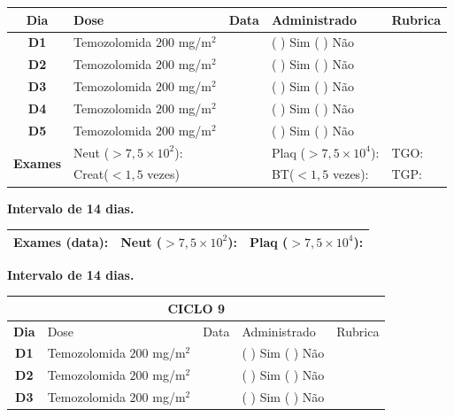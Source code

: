 \documentclass[11pt,a4paper,oldfontcommands]{memoir}
\begin{document}
\begin{center}
\begin{table}[H]
\begin{tabular}{p{1cm}p{5cm}|p{1cm}|p{4.5cm}|p{2cm}}
\hline
    \multicolumn{1}{c|}{\multirow{1}{*}{\textbf{Dia}}}&{Dose}&{Data}&{Administrado}&{Rubrica} \\
    \hline
    \multicolumn{1}{c|}{\multirow{1}{*}{\textbf{D1}}}&{Temozolomida \(200\) mg/m\(^2\)}&&{(  ) Sim (  ) Não}&\\
    \multicolumn{1}{c|}{\multirow{1}{*}{\textbf{D2}}}&{Temozolomida \(200\) mg/m\(^2\)}&&{(  ) Sim (  ) Não}&\\
    \multicolumn{1}{c|}{\multirow{1}{*}{\textbf{D3}}}&{Temozolomida \(200\) mg/m\(^2\)}&&{(  ) Sim (  ) Não}&\\
    \multicolumn{1}{c|}{\multirow{1}{*}{\textbf{D4}}}&{Temozolomida \(200\) mg/m\(^2\)}&&{(  ) Sim (  ) Não}&\\
    \multicolumn{1}{c|}{\multirow{1}{*}{\textbf{D5}}}&{Temozolomida \(200\) mg/m\(^2\)}&&{(  ) Sim (  ) Não}&\\
    \hline
    \multicolumn{1}{c|}{\multirow{2}{*}{\textbf{Exames}}}&\multicolumn{2}{l|}{Neut (\(>7,5\times10^2\)):}&{Plaq (\(>7,5\times10^4\)):}&{TGO:}\\
    \cline{2-5}
    \multicolumn{1}{c|}{\multirow{2}{*}{{}}}&\multicolumn{2}{l|}{Creat(\(<1,5\) vezes)}&{BT(\(<1,5\) vezes):}&{TGP:}
    \\
    \hline
\end{tabular}
\end{table}
\textbf{Intervalo de 14 dias.}
\begin{table}[H]
\begin{tabular}{p{5cm}|p{5cm}|p{4.7cm}}
    \hline
    \textbf{Exames (data):}&{Neut (\(>7,5\times10^2\)):}&{Plaq (\(>7,5\times10^4\)):}
    \\
    \hline
\end{tabular}
\end{table}
\textbf{Intervalo de 14 dias.}
\begin{table}[H]
\begin{tabular}{p{1cm}p{5cm}|p{1cm}|p{4.5cm}|p{2cm}}
	\hline
	\multicolumn{5}{c}{\textbf{CICLO 9}}\\
\hline
    \multicolumn{1}{c|}{\multirow{1}{*}{\textbf{Dia}}}&{Dose}&{Data}&{Administrado}&{Rubrica} \\
    \hline
    \multicolumn{1}{c|}{\multirow{1}{*}{\textbf{D1}}}&{Temozolomida \(200\) mg/m\(^2\)}&&{(  ) Sim (  ) Não}&\\
    \multicolumn{1}{c|}{\multirow{1}{*}{\textbf{D2}}}&{Temozolomida \(200\) mg/m\(^2\)}&&{(  ) Sim (  ) Não}&\\
    \multicolumn{1}{c|}{\multirow{1}{*}{\textbf{D3}}}&{Temozolomida \(200\) mg/m\(^2\)}&&{(  ) Sim (  ) Não}&\\

\end{tabular}
\end{table}
\end{center}
\end{document}
